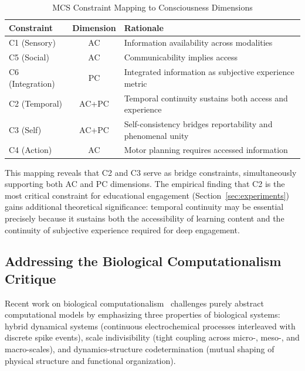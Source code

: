 \documentclass[10pt,journal,compsoc]{IEEEtran}
\begin{document}
\begin{table}[!t]
\renewcommand{\arraystretch}{1.3}
\caption{MCS Constraint Mapping to Consciousness Dimensions}
\label{tab:ac_pc_mapping}
\centering
\begin{tabular}{lcp{1.8in}}
\toprule
\textbf{Constraint} & \textbf{Dimension} & \textbf{Rationale} \\
\midrule
C1 (Sensory) & AC & Information availability across modalities \\
C5 (Social) & AC & Communicability implies access \\
C6 (Integration) & PC & Integrated information as subjective experience metric \\
C2 (Temporal) & AC+PC & Temporal continuity sustains both access and experience \\
C3 (Self) & AC+PC & Self-consistency bridges reportability and phenomenal unity \\
C4 (Action) & AC & Motor planning requires accessed information \\
\bottomrule
\end{tabular}
\end{table}

This mapping reveals that C2 and C3 serve as bridge constraints, simultaneously supporting both AC and PC dimensions. The empirical finding that C2 is the most critical constraint for educational engagement (Section~\ref{sec:experiments}) gains additional theoretical significance: temporal continuity may be essential precisely because it sustains both the accessibility of learning content and the continuity of subjective experience required for deep engagement.

\subsection{Addressing the Biological Computationalism Critique}

Recent work on biological computationalism~\cite{Milinkovic2025} challenges purely abstract computational models by emphasizing three properties of biological systems: hybrid dynamical systems (continuous electrochemical processes interleaved with discrete spike events), scale indivisibility (tight coupling across micro-, meso-, and macro-scales), and dynamics-structure codetermination (mutual shaping of physical structure and functional organization).
\end{document}
